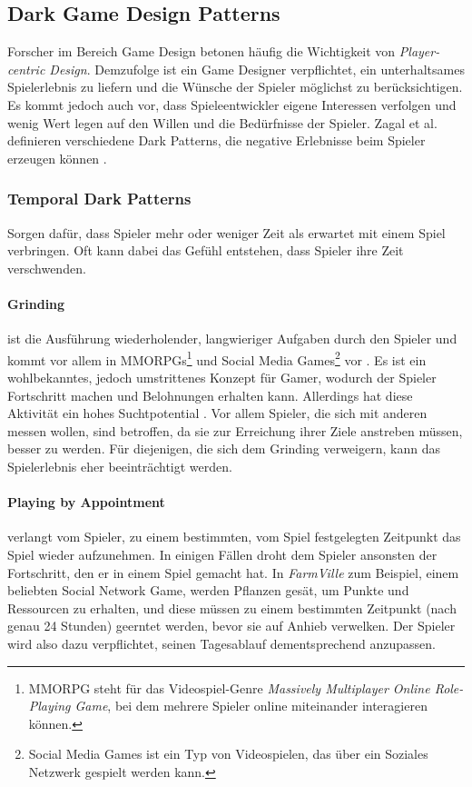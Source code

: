 \documentclass[a4paper]{article}
\begin{document}
\subsection{Dark Game Design Patterns}
\label{sub:games}
Forscher im Bereich Game Design betonen häufig die Wichtigkeit von \textit{Player-centric Design}. Demzufolge ist ein Game Designer verpflichtet, ein unterhaltsames Spielerlebnis zu liefern und die Wünsche der Spieler möglichst zu berücksichtigen.\newline
Es kommt jedoch auch vor, dass Spieleentwickler eigene Interessen verfolgen und wenig Wert legen auf den Willen und die Bedürfnisse der Spieler. Zagal et al. definieren verschiedene Dark Patterns, die negative Erlebnisse beim Spieler erzeugen können \cite{zagal}.

\subsubsection{Temporal Dark Patterns}
\label{sssec:temporal_dark_patterns}
Sorgen dafür, dass Spieler mehr oder weniger Zeit als erwartet mit einem Spiel verbringen. Oft kann dabei das Gefühl entstehen, dass Spieler ihre Zeit verschwenden.

\paragraph{Grinding}
\label{para:grinding}
ist die Ausführung wiederholender, langwieriger Aufgaben durch den Spieler und kommt vor allem in MMORPGs\footnote{\label{foot:8} MMORPG steht für das Videospiel-Genre \textit{Massively Multiplayer Online Role-Playing Game}, bei dem mehrere Spieler online miteinander interagieren können.} und Social Media Games\footnote{\label{foot:9} Social Media Games ist ein Typ von Videospielen, das über ein Soziales Netzwerk gespielt werden kann.} vor \cite{nakamura}. Es ist ein wohlbekanntes, jedoch umstrittenes Konzept für Gamer, wodurch der Spieler Fortschritt machen und Belohnungen erhalten kann. Allerdings hat diese Aktivität ein hohes Suchtpotential \cite{king}.\newline 
Vor allem Spieler, die sich mit anderen messen wollen, sind betroffen, da sie zur Erreichung ihrer Ziele anstreben müssen, besser zu werden. Für diejenigen, die sich dem Grinding verweigern, kann das Spielerlebnis eher beeinträchtigt werden. 

\paragraph{Playing by Appointment}
\label{para:playing_by_appointment}
verlangt vom Spieler, zu einem bestimmten, vom Spiel festgelegten Zeitpunkt das Spiel wieder aufzunehmen. In einigen Fällen droht dem Spieler ansonsten der Fortschritt, den er in einem Spiel gemacht hat.\newline
In \textit{FarmVille} zum Beispiel, einem beliebten Social Network Game, werden Pflanzen gesät, um Punkte und Ressourcen zu erhalten, und diese müssen zu einem bestimmten Zeitpunkt (nach genau 24 Stunden) geerntet werden, bevor sie auf Anhieb verwelken. Der Spieler wird also dazu verpflichtet, seinen Tagesablauf dementsprechend anzupassen.
\end{document}
